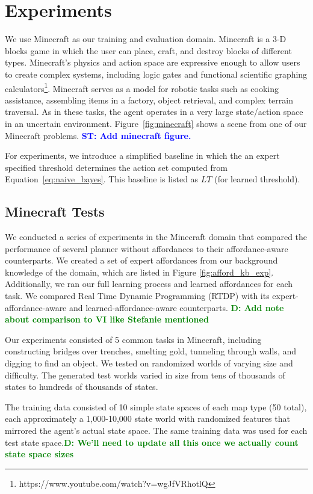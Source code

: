 \documentclass[conference]{IEEEtran}
\newcommand{\stnote}[1]{\textcolor{Blue}{\textbf{ST: #1}}}
\newcommand{\dnote}[1]{\textcolor{Green}{\textbf{D: #1}}}
\begin{document}
\section{Experiments}
\label{sec:experiments}

We use Minecraft as our training and evaluation domain. Minecraft is a
3-D blocks game in which the user can place, craft, and destroy blocks
of different types.  Minecraft's physics and action space are
expressive enough to allow users to create complex systems, including
logic gates and functional scientific graphing
calculators\footnote{https://www.youtube.com/watch?v=wgJfVRhotlQ}.
Minecraft serves as a model for robotic tasks such as cooking
assistance, assembling items in a factory, object retrieval, and
complex terrain traversal.  As in these tasks, the agent operates in a
very large state/action space in an uncertain environment.
Figure~\ref{fig:minecraft} shows a scene from one of our Minecraft
problems. \stnote{Add minecraft figure.}

For experiments, we introduce a simplified baseline in which the an expert specified threshold
determines the action set computed from Equation~\ref{eq:naive_bayes}. This
baseline is listed as $LT$ (for learned threshold).

\subsection{Minecraft Tests}
We conducted a series of experiments in the Minecraft domain that
compared the performance of several planner without affordances
to their affordance-aware counterparts. We created a set of expert
affordances from our background knowledge of the domain, which are
listed in Figure \ref{fig:afford_kb_exp}. Additionally, we ran our full
learning process and learned affordances for each task. We compared
Real Time Dynamic Programming (RTDP) with its expert-affordance-aware
and learned-affordance-aware counterparts. \dnote{Add note about
comparison to VI like Stefanie mentioned}

Our experiments consisted of 5 common tasks in Minecraft, including
constructing bridges over trenches, smelting gold, tunneling
through walls, and digging to find an object.  We tested on 
randomized worlds of varying size and difficulty. The generated test
worlds varied in size from tens of thousands of states to hundreds of thousands of states.

The training data consisted of 10 simple state spaces of each map type
(50 total), each approximately a 1,000-10,000 state world with randomized
features that mirrored the agent's actual state space. The same training data
was used for each test state space.\dnote{We'll need to update all this once
we actually count state space sizes}
\end{document}
